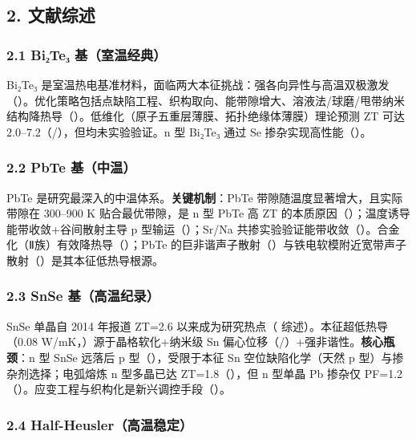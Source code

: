 \documentclass[12pt,a4paper]{ctexart}
\begin{document}
\subsection{2. 文献综述}\label{ux6587ux732eux7efcux8ff0}

\subsubsection{2.1 Bi₂Te₃ 基（室温经典）}\label{biux2082teux2083-ux57faux5ba4ux6e29ux7ecfux5178}

Bi₂Te₃ 是室温热电基准材料，面临两大本征挑战：强各向异性与高温双极激发（\cite{TE065}）。优化策略包括点缺陷工程、织构取向、能带隙增大、溶液法/球磨/甩带纳米结构降热导（\cite{TE065}）。低维化（原子五重层薄膜、拓扑绝缘体薄膜）理论预测 ZT 可达 2.0--7.2（\cite{TE062}/\cite{TE063}），但均未实验验证。n 型 Bi₂Te₃ 通过 Se 掺杂实现高性能（\cite{TE070}）。

\subsubsection{2.2 PbTe 基（中温）}\label{pbte-ux57faux4e2dux6e29}

PbTe 是研究最深入的中温体系。\textbf{关键机制}：PbTe 带隙随温度显著增大，且实际带隙在 300--900 K 贴合最优带隙，是 n 型 PbTe 高 ZT 的本质原因（\cite{TE085}）；温度诱导能带收敛+谷间散射主导 p 型输运（\cite{TE090}）；Sr/Na 共掺实验验证能带收敛（\cite{TE105}）。合金化（Ⅱ族）有效降热导（\cite{TE098}）；PbTe 的巨非谐声子散射（\cite{TE097}）与铁电软模附近宽带声子散射（\cite{TE109}）是其本征低热导根源。

\subsubsection{2.3 SnSe 基（高温纪录）}\label{snse-ux57faux9ad8ux6e29ux7eaaux5f55}

SnSe 单晶自 2014 年报道 ZT=2.6 以来成为研究热点（\cite{TE110} 综述）。本征超低热导（0.08 W/mK，\cite{TE126}）源于晶格软化+纳米级 Sn 偏心位移（\cite{TE124}/\cite{TE133}）+强非谐性。\textbf{核心瓶颈}：n 型 SnSe 远落后 p 型（\cite{TE122}），受限于本征 Sn 空位缺陷化学（天然 p 型）与掺杂剂选择；电弧熔炼 n 型多晶已达 ZT=1.8（\cite{TE115}），但 n 型单晶 Pb 掺杂仅 PF=1.2（\cite{TE119}）。应变工程与织构化是新兴调控手段（\cite{TE120}）。

\subsubsection{2.4 Half-Heusler（高温稳定）}\label{half-heuslerux9ad8ux6e29ux7a33ux5b9a}
\end{document}
